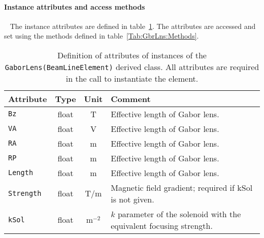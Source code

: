 \paragraph{Instance attributes and access methods} ~\newline
\label{SubSubSect:GbrLns:InstAttr}
\noindent
The instance attributes are defined in
table~\ref{Tab:GbrLns:Attributes}. 
The attributes are accessed and set using the methods defined in
table~\ref{Tab:GbrLns:Methods}.
\begin{table}[h]
  \caption{
    Definition of attributes of instances of
    the \texttt{GaborLens(BeamLineElement)} derived class.
    All attributes are required in the call to instantiate the
    element.
  }
  \label{Tab:GbrLns:Attributes}
  \begin{center}
    \begin{tabular}{|l|c|c|p{10cm}|}
      \hline
      \textbf{Attribute}   & \textbf{Type} & \textbf{Unit} & \textbf{Comment}                    \\
      \hline
      \texttt{Bz}   & float & T     & Effective length of Gabor lens.                            \\
      \texttt{VA}   & float & V     & Effective length of Gabor lens.                            \\
      \texttt{RA}   & float & m     & Effective length of Gabor lens.                            \\
      \texttt{RP}   & float & m     & Effective length of Gabor lens.                            \\
      \texttt{Length}   & float & m     & Effective length of Gabor lens.                         \\
      \texttt{Strength} & float & T/m   & Magnetic field gradient; required if kSol is not given. \\
      \texttt{kSol}     & float & m$^{-2}$ & $k$ parameter of the solenoid with the equivalent
                                            focusing strength.                                    \\
      \hline
    \end{tabular}
  \end{center}
\end{table}
